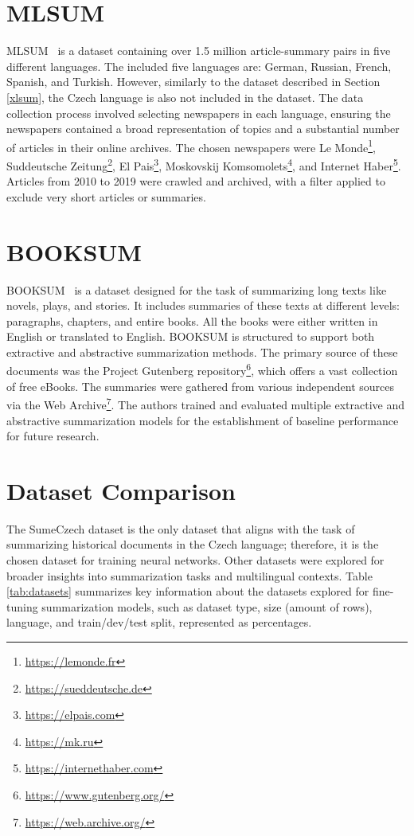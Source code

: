 \documentclass[english, ba, kiv, he, iso690numb, pdf, viewonly]{fasthesis}
\begin{document}
\section{MLSUM}
MLSUM~\cite{scialom2020mlsum} is a dataset containing over 1.5 million article-summary pairs in five different languages. The included five languages are: German, Russian, French, Spanish, and Turkish. However, similarly to the dataset described in Section \ref{xlsum}, the Czech language is also not included in the dataset. The data collection process involved selecting newspapers in each language, ensuring the newspapers contained a broad representation of topics and a substantial number of articles in their online archives. The chosen newspapers were Le Monde\footnote{\url{https://lemonde.fr}}, Suddeutsche Zeitung\footnote{\url{https://sueddeutsche.de}}, El Pais\footnote{\url{https://elpais.com}}, Moskovskij Komsomolets\footnote{\url{https://mk.ru}}, and Internet Haber\footnote{\url{https://internethaber.com}}. Articles from 2010 to 2019 were crawled and archived, with a filter applied to exclude very short articles or summaries.

\section{BOOKSUM}
BOOKSUM~\cite{kryscinski2021booksum} is a dataset designed for the task of summarizing long texts like novels, plays, and stories. It includes summaries of these texts at different levels: paragraphs, chapters, and entire books. All the books were either written in English or translated to English. BOOKSUM is structured to support both extractive and abstractive summarization methods. The primary source of these documents was the Project Gutenberg repository\footnote{\url{https://www.gutenberg.org/}}, which offers a vast collection of free eBooks. The summaries were gathered from various independent sources via the Web Archive\footnote{\url{https://web.archive.org/}}. The authors trained and evaluated multiple extractive and abstractive summarization models for the establishment of baseline performance for future research.

\section{Dataset Comparison}
The SumeCzech dataset is the only dataset that aligns with the task of summarizing historical documents in the Czech language; therefore, it is the chosen dataset for training neural networks. Other datasets were explored for broader insights into summarization tasks and multilingual contexts. Table \ref{tab:datasets} summarizes key information about the datasets explored for fine-tuning summarization models, such as dataset type, size (amount of rows), language, and train/dev/test split, represented as percentages.
\end{document}
